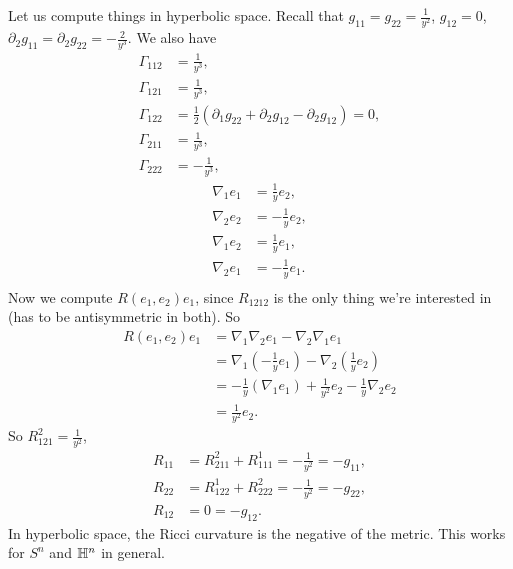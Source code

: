 \begin{example}
    Let us compute things in hyperbolic space. Recall that $g_{11}=g_{22}=\frac{1}{y^2}$, $g_{12}=0$, $\partial _2 g_{11}=\partial_2g_{22}=-\frac{2}{y^3}$. We also have 
    \begin{align*}
        \Gamma _{112}&=\frac{1}{y^3},\\
        \Gamma _{121}&=\frac{1}{y^3},\\
        \Gamma _{122}&=\frac{1}{2}(\partial_1g_{22}+\partial_2g_{12}-\partial_2g_{12})=0,\\
        \Gamma _{211}&=\frac{1}{y^3},\\
        \Gamma _{222}&=-\frac{1}{y^3},
    \end{align*}
    \begin{align*}
        \nabla_1e_1&=\frac{1}{y}e_2,\\
        \nabla_2e_2&=-\frac{1}{y}e_2,\\
        \nabla_1e_2&=\frac{1}{y}e_1,\\
        \nabla_2e_1&=-\frac{1}{y}e_1.\\
    \end{align*}
    Now we compute $R(e_1,e_2)e_1$, since $R_{1212}$ is the only thing we're interested in (has to be antisymmetric in both). So 
    \begin{align*}
        R(e_1,e_2)e_1&=\nabla_1\nabla_2e_1-\nabla_2\nabla_1e_1\\
                     &=\nabla_1\left( -\frac{1}{y}e_1 \right) -\nabla_2\left( \frac{1}{y}e_2 \right) \\
                     &=-\frac{1}{y}\left( \nabla_1e_1 \right) +\frac{1}{y^2}e_2-\frac{1}{y}\nabla_2e_2\\
                     &=\frac{1}{y^2}e_2.
    \end{align*}So $R_{121}^2=\frac{1}{y^2}$, 
    \begin{align*}
        R_{11}&= R_{211}^2+R_{111}^1=- \frac{1}{y^2}=-g_{11},\\
        R_{22}&=R_{122}^1+R_{222}^2=-\frac{1}{y^2}=-g_{22},\\
        R_{12}&=0=-g_{12}.
    \end{align*}In hyperbolic space, the Ricci curvature is the negative of the metric. This works for $S^n $ and $\mathbb{H}^n $ in general.
\end{example}
